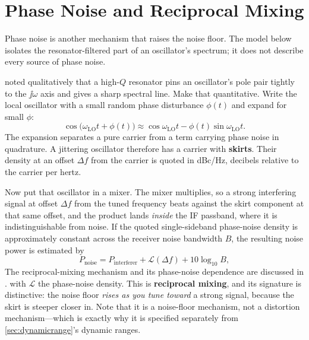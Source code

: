 \section{Phase Noise and Reciprocal Mixing}
\label{sec:phasenoise}
Phase noise is another mechanism that raises the noise floor. The model below isolates
the resonator-filtered part of an oscillator's spectrum; it does not describe every
source of phase noise.

 noted qualitatively that a high-\(Q\) resonator pins an oscillator's
pole pair tightly to the \(\jj\omega\) axis and gives a sharp spectral line. Make that
quantitative. Write the local oscillator with a small random phase disturbance
\(\phi(t)\) and expand for small \(\phi\):
\[
\cos\bigl(\omega_{\mathrm{LO}}t+\phi(t)\bigr)
\approx\cos\omega_{\mathrm{LO}}t-\phi(t)\sin\omega_{\mathrm{LO}}t .
\]
The expansion separates a pure carrier from a term carrying phase noise in quadrature.
A jittering oscillator therefore has a carrier with \textbf{skirts}. Their density at
an offset \(\Delta f\) from the carrier is quoted in dBc/Hz, decibels relative to the
carrier per hertz.

Now put that oscillator in a mixer. The mixer multiplies, so a strong interfering signal
at offset \(\Delta f\) from the tuned frequency beats against the skirt component at
that same offset, and the product lands \emph{inside} the IF passband, where it is
indistinguishable from noise. If the quoted single-sideband phase-noise density is
approximately constant across the receiver noise bandwidth \(B\), the resulting
noise power is estimated by
\[
P_{\text{noise}}=P_{\text{interferer}}+\mathcal{L}(\Delta f)+10\log_{10}B ,
\]
The reciprocal-mixing mechanism and its phase-noise dependence are discussed in
\cite[pp.~245--250]{egan2003practical}.
with \(\mathcal{L}\) the phase-noise density. This is \textbf{reciprocal mixing}, and
its signature is distinctive: the noise floor \emph{rises as you tune toward} a strong
signal, because the skirt is steeper closer in. Note that it is a noise-floor
mechanism, not a distortion mechanism---which is exactly why it is specified separately
from \cref{sec:dynamicrange}'s dynamic ranges.

